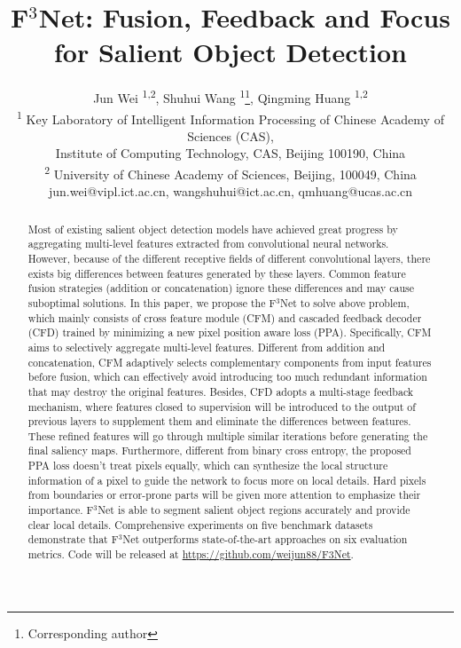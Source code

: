 \documentclass[letterpaper]{article} %
\title{F$^3$Net: Fusion, Feedback and Focus for Salient Object Detection}
\author{ Jun Wei          \textsuperscript{\rm 1,2}, 
         Shuhui Wang      \textsuperscript{\rm 1}\thanks{Corresponding author}, 
         Qingming Huang   \textsuperscript{\rm 1,2} \\
         \textsuperscript{\rm 1} Key Laboratory of Intelligent Information Processing of Chinese Academy of Sciences (CAS), \\ Institute of Computing Technology, CAS, Beijing 100190, China \\
         \textsuperscript{\rm 2} University of Chinese Academy of Sciences, Beijing, 100049, China \\ 
         jun.wei@vipl.ict.ac.cn, wangshuhui@ict.ac.cn, qmhuang@ucas.ac.cn\\
}
\begin{document}
\maketitle

\begin{abstract}
Most of existing salient object detection models have achieved great progress by aggregating multi-level features extracted from convolutional neural networks. However, because of the different receptive fields of different convolutional layers, there exists big differences between features generated by these layers. Common feature fusion strategies (addition or concatenation) ignore these differences and may cause suboptimal solutions. In this paper, we propose the F$^3$Net to solve above problem, which mainly consists of cross feature module (CFM) and cascaded feedback decoder (CFD) trained by minimizing a new pixel position aware loss (PPA). Specifically, CFM aims to selectively aggregate multi-level features. Different from addition and concatenation, CFM adaptively selects complementary components from input features before fusion, which can effectively avoid introducing too much redundant information that may destroy the original features. Besides, CFD adopts a multi-stage feedback mechanism, where features closed to supervision will be introduced to the output of previous layers to supplement them and eliminate the differences between features. These refined features will go through multiple similar iterations before generating the final saliency maps. Furthermore, different from binary cross entropy, the proposed PPA loss doesn’t treat pixels equally, which can synthesize the local structure information of a pixel to guide the network to focus more on local details. Hard pixels from boundaries or error-prone parts will be given more attention to emphasize their importance. F$^3$Net is able to segment salient object regions accurately and provide clear local details. Comprehensive experiments on five benchmark datasets demonstrate that F$^3$Net outperforms state-of-the-art approaches on six evaluation metrics. Code will be released at \url{https://github.com/weijun88/F3Net}.
\end{abstract}
\end{document}
